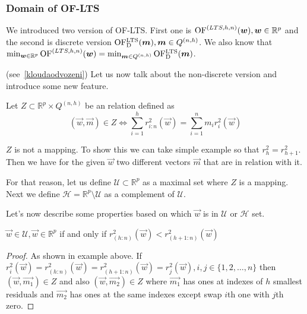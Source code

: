 \subsubsection{Domain of OF-LTS}
We introduced two version of OF-LTS. First one is 
$\operatorname{OF}^{(LTS, h, n)}(\boldsymbol{w}), \boldsymbol{w} \in \mathbb{R}^p$ and the second is discrete version 
$\operatorname{OF^{LTS}_D}(\boldsymbol{m}), \boldsymbol{m} \in Q^{(n,h)}$. 
We also know that 
$\operatorname*{min}_{\boldsymbol{w} \in \mathbb{R}^p} \operatorname{OF}^{(LTS, h, n)}(\boldsymbol{w})  =  \operatorname*{min}_{\boldsymbol{m} \in Q^{(n,h)}} \operatorname{OF^{LTS}_D}(\boldsymbol{m})$.

 (see~\eqref{kloudaodvozeni}) Let us now talk about the non-discrete version and introduce some new feature.

\begin{definition}
    Let $Z \subset \mathbb{R}^p \times  Q^{(n,h)}$ be an relation defined as
    \begin{equation}
        (\vec{w}, \vec{m}) \in Z \Leftrightarrow \sum\limits_{i=1}^h r_{i:n}^2(\vec{w}) = \sum\limits_{i=1}^n m_i r_{i}^2(\vec{w})
    \end{equation}
\end{definition}


$Z$ is not a mapping. To show this we can take simple example so that $r^{2}_{h} = r^{2}_{h+1}$. Then we have for the given $\vec{w}$ two different vectors $\vec{m}$ that are in relation with it.

For that reason, let us define  $\mathcal{U} \subset \mathbb{R}^{p}$ as a maximal set where $Z$ is a mapping. Next we define 
$\mathcal{H} = \mathbb{R}^{p}  \setminus   \mathcal{U}$
as a complement of $\mathcal{U}$.

Let's now describe some properties based on which $\vec{w}$ is in $\mathcal{U}$ or $\mathcal{H}$ set.

\begin{theorem} \label{klouda1}
    $\vec{w} \in \mathcal{U}, \vec{w} \in \mathbb{R}^{p}$ if and only if 
    $r^{2}_{(h:n)}(\vec{w}) < r^{2}_{(h+1:n)}(\vec{w})$
\end{theorem}
\begin{proof}
    As shown in example above. If $r^{2}_{i}(\vec{w}) = r^{2}_{(h:n)}(\vec{w}) = r^{2}_{(h+1:n)}(\vec{w}) = r^{2}_{j}(\vec{w}), i,j \in   \{{1,2,\ldots , n\}} $ then $(\vec{w}, \vec{m_1}) \in Z$ and also $(\vec{w}, \vec{m_2}) \in Z$ where $\vec{m_1}$ has ones at indexes of $h$ smallest residuals and $\vec{m_2}$ has ones at the same indexes except swap $i$th one with $j$th zero.
\end{proof}

